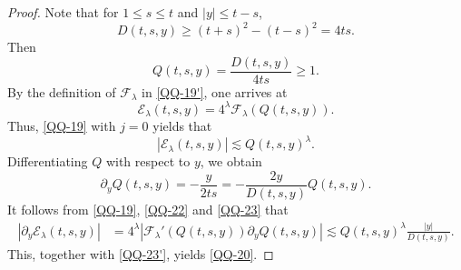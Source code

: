 \documentclass[11pt,twoside]{article}
\newcommand{\p}{\partial}
\newcommand{\f}{\frac}
\newcommand{\Ecal}{\mathcal E}
\theoremstyle{plain}
\theoremstyle{definition}
\theoremstyle{remark}
\numberwithin{equation}{section}
\begin{document}
\begin{proof}
Note that  for $1\leq s\leq t$ and $|y|\leq t-s$,
\[
D(t,s,y)\geq(t+s)^2-(t-s)^2=4ts.
\]
Then
\[
Q(t,s,y)=\f{D(t,s,y)}{4ts}\geq1.
\]
By the definition of
$\mathcal F_\lambda$ in \eqref{QQ-19'}, one arrives at
\begin{equation}\label{QQ-22}
\Ecal_\lambda(t,s,y)
=
4^\lambda\mathcal F_\lambda(Q(t,s,y)).
\end{equation}
Thus,  \eqref{QQ-19} with $j=0$ yields that
\begin{equation}\label{QQ-23'}
|\Ecal_\lambda(t,s,y)|
\lesssim
Q(t,s,y)^\lambda.
\end{equation}
Differentiating $Q$ with respect to $y$, we obtain
\begin{equation}\label{QQ-23}
\p_yQ(t,s,y)
=
-\f{y}{2ts}
=
-\f{2y}{D(t,s,y)}Q(t,s,y).
\end{equation}
It follows from \eqref{QQ-19}, \eqref{QQ-22} and \eqref{QQ-23} that
\[
\begin{aligned}
|\p_y\Ecal_\lambda(t,s,y)|
&=
4^\lambda
\left|
\mathcal F_\lambda'(Q(t,s,y))\p_yQ(t,s,y)
\right|
\lesssim
Q(t,s,y)^\lambda\f{|y|}{D(t,s,y)}.
\end{aligned}
\]
This, together with \eqref{QQ-23'}, yields \eqref{QQ-20}.


\end{proof}
\end{document}

